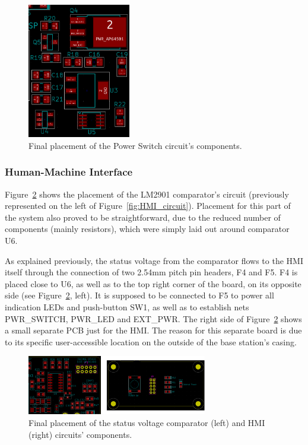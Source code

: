 \begin{figure}[h]
	\centering
	\includegraphics[width=0.4\textwidth]{Chapters/Figures/chapter5/placement_PowerSwitch.png}
	\caption{Final placement of the Power Switch circuit's components.}
	\label{fig:placement_PowerSwitch}
\end{figure}%


\subsubsection{Human-Machine Interface}\label{sec:5116_HMI}

Figure~\ref{fig:placement_HMI} shows the placement of the LM2901 comparator's circuit (previously represented on the left of Figure~\ref{fig:HMI_circuit}).
Placement for this part of the system also proved to be straightforward, due to the reduced number of components (mainly resistors), which were simply laid out around comparator U6.

As explained previously, the status voltage from the comparator flows to the HMI itself through the connection of two 2.54mm pitch pin headers, F4 and F5. F4 is placed close to U6, as well as to the top right corner of the board, on its opposite side (see Figure~\ref{fig:placement_HMI}, left). It is supposed to be connected to F5 to power all indication LEDs and push-button SW1, as well as to establish nets PWR\_SWITCH, PWR\_LED and EXT\_PWR. The right side of Figure~\ref{fig:placement_HMI} shows a small separate PCB just for the HMI. The reason for this separate board is due to its specific user-accessible location on the outside of the base station's casing.

\begin{figure}[h]
	\centering
	\includegraphics[width=0.7\textwidth]{Chapters/Figures/chapter5/placement_HMI.png}
	\caption{Final placement of the status voltage comparator (left) and HMI (right) circuits' components.}
	\label{fig:placement_HMI}
\end{figure}%



